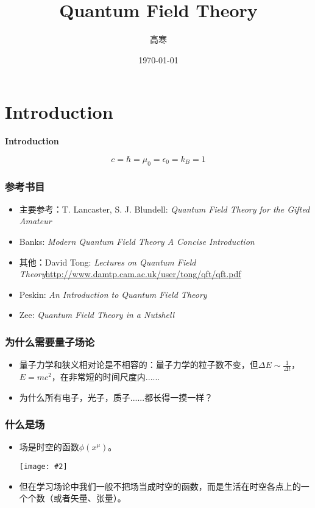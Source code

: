 \documentclass[aspectratio=1610,14pt,mathserif]{beamer}
\title{Quantum Field Theory}
\author{高寒}
\date{\today}
\newcommand{\bch}{}
\newcommand{\ech}{}
\def\bcenter{\begin{center}}
\def\ecenter{\end{center}}
\def\skipline{{\vskip0.1in}}
\def\tbox#1{\begin{tcolorbox}#1\end{tcolorbox}}
\def\secpage#1#2{\begin{frame}\bch\bcenter{\bf \Huge #1} \skipline \tbox{#2}\ecenter\ech\end{frame}}
\newcommand{\cpic}[2]{
\begin{center}
\texttt{[image: \#2]}
\end{center}
}
\begin{document}
\begin{frame}
 
\titlepage
\begin{center}
\tableofcontents
\end{center}

\end{frame}

\section{Introduction}
\secpage{Introduction}{$$c=\hbar =\mu_0 =\epsilon_0= k_B=1$$}

\begin{frame}
\frametitle{\bch 参考书目 \ech}
\bch
\begin{itemize}
\item 主要参考：T. Lancaster, S. J. Blundell: \emph{Quantum Field Theory for the Gifted Amateur}
\item Banks: \emph{Modern Quantum Field Theory A Concise Introduction}
\item 其他：David Tong: \emph{Lectures on Quantum Field Theory}\url{http://www.damtp.cam.ac.uk/user/tong/qft/qft.pdf}
\item Peskin: \emph{An Introduction to Quantum Field Theory}
\item Zee: \emph{Quantum Field Theory in a Nutshell}
\end{itemize}
\ech
\end{frame}

\begin{frame}
\frametitle{\bch 为什么需要量子场论 \ech}
\bch
\begin{itemize}
\item 量子力学和狭义相对论是不相容的：量子力学的粒子数不变，但$\Delta E \sim \frac{1}{\Delta t}$，$E = mc^2$，在非常短的时间尺度内......
\item 为什么所有电子，光子，质子......都长得一摸一样？
\end{itemize}
\ech
\end{frame}


\begin{frame}
\frametitle{\bch 什么是场 \ech}
\bch
\begin{itemize}
\item 场是时空的函数$\phi(x^\mu)$。
\cpic{0.3}{field}
\item 但在学习场论中我们一般不把场当成时空的函数，而是生活在时空各点上的一个个数（或者矢量、张量）。
\end{itemize}
\ech
\end{frame}
\end{document}
